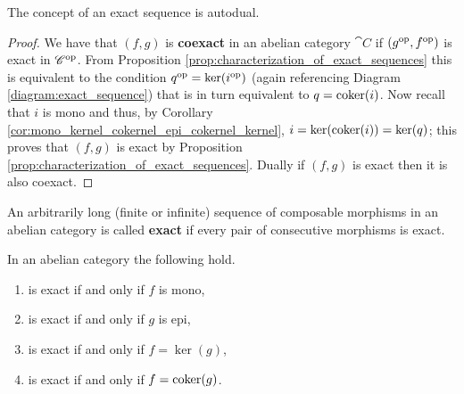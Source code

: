 \begin{remark}
  \label{rem:coexact_sequences}
  The concept of an exact sequence is autodual.
\end{remark}

\begin{proof}
  We have that \((f, g)\) is {\bf coexact} in an abelian category \(\cat{C}\) if \((g^{\text{op}}, f^{\text{op}})\) is exact in \({\mathscr C}^{\text{op}}\). From Proposition \ref{prop:characterization_of_exact_sequences} this is equivalent to the condition \(q^{\text{op}} = \ker(i^{\text{op}})\) (again referencing Diagram \ref{diagram:exact_sequence}) that is in turn equivalent to \(q = \operatorname{coker}(i)\). Now recall that \(i\) is mono and thus, by Corollary \ref{cor:mono_kernel_cokernel_epi_cokernel_kernel}, \(i=\ker(\operatorname{coker}(i)) = \ker(q)\); this proves that \((f, g)\) is exact by Proposition \ref{prop:characterization_of_exact_sequences}. Dually if \((f, g)\) is exact then it is also coexact.
\end{proof}

\begin{definition}
  \label{def:longer_exact_sequence}
  An arbitrarily long (finite or infinite) sequence of composable morphisms in an abelian category is called {\bf exact} if every pair of consecutive morphisms is exact.
\end{definition}

\begin{proposition}
  \label{prop:sequences_with_zero}
  In an abelian category the following hold.
  \begin{enumerate}[label=(\arabic*)]
  \item {} is exact if and only if \(f\) is mono,
  \item {} is exact if and only if \(g\) is epi,
  \item {} is exact if and only if \(f = \ker(g)\),
  \item {} is exact if and only if \(f = \operatorname{coker}(g)\).
  \end{enumerate}
\end{proposition}

